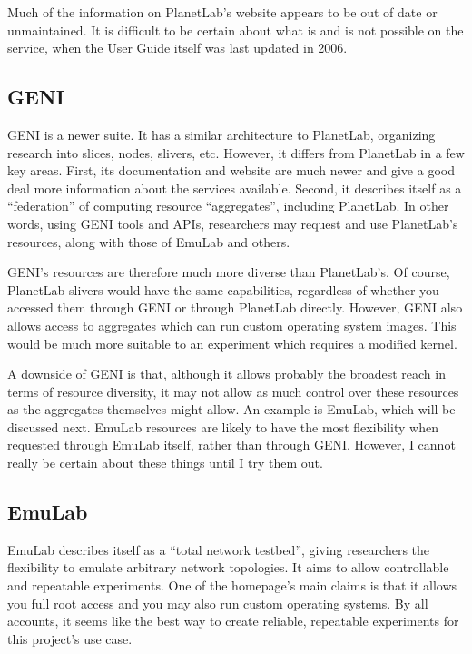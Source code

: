 \documentclass{article}
\begin{document}
Much of the information on PlanetLab's website appears to be out of date or
unmaintained. It is difficult to be certain about what is and is not possible on
the service, when the User Guide itself was last updated in 2006.

\subsection{GENI}

GENI is a newer suite. It has a similar architecture to PlanetLab, organizing
research into slices, nodes, slivers, etc. However, it differs from PlanetLab in
a few key areas. First, its documentation and website are much newer and give a
good deal more information about the services available. Second, it describes
itself as a ``federation'' of computing resource ``aggregates'', including
PlanetLab. In other words, using GENI tools and APIs, researchers may request
and use PlanetLab's resources, along with those of EmuLab and others.

GENI's resources are therefore much more diverse than PlanetLab's. Of course,
PlanetLab slivers would have the same capabilities, regardless of whether you
accessed them through GENI or through PlanetLab directly. However, GENI also
allows access to aggregates which can run custom operating system images. This
would be much more suitable to an experiment which requires a modified kernel.

A downside of GENI is that, although it allows probably the broadest reach in
terms of resource diversity, it may not allow as much control over these
resources as the aggregates themselves might allow. An example is EmuLab, which
will be discussed next. EmuLab resources are likely to have the most flexibility
when requested through EmuLab itself, rather than through GENI. However, I
cannot really be certain about these things until I try them out.

\subsection{EmuLab}

EmuLab describes itself as a ``total network testbed'', giving researchers the
flexibility to emulate arbitrary network topologies. It aims to allow
controllable and repeatable experiments. One of the homepage's main claims is
that it allows you full root access and you may also run custom operating
systems. By all accounts, it seems like the best way to create reliable,
repeatable experiments for this project's use case.
\end{document}

